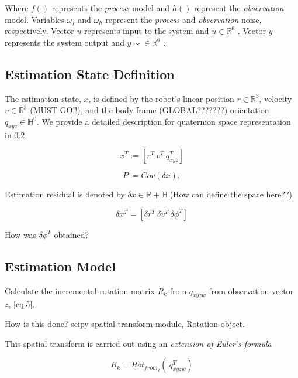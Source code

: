 \documentclass[letterpaper, 10 pt, conference]{ieeeconf}  %
\newcommand{\transpose}[1]{\ensuremath{#1^{\scriptscriptstyle T}}}
\begin{document}
Where $f()$ represents the \textit{process} model and $h()$ represent the
\textit{observation} model.
Variables $\omega_{f}$ and $\omega_{h}$ represent the \textit{process} and \textit{observation} noise, respectively.
Vector $u$ represents input to the system and $u \in \mathbb{R}^{6}$ .
Vector $y$ represents the system output and $y \sim \in \mathbb{R}^6$ .


\subsection{Estimation State Definition}

The estimation state, $x$, is defined by the robot's linear position $r \in \mathbb{R}^3$, velocity
$v \in \mathbb{R}^3$ (MUST GO!!), and the body frame (GLOBAL???????) orientation $q_{xyz} \in \mathbb{H}^0$. We provide a detailed description for quaternion space representation in \ref{}

\begin{equation}
\label{eq:8}
\transpose{x} :=  \left[\transpose{r}~\transpose{v}~\transpose{q_{xyz}} \right]
\end{equation}

\begin{equation}
\label{eq:9}
P := Cov(\delta x),
\end{equation}

Estimation residual is denoted by $\delta x \in \mathbb{R + H}$  (How can define the space here??)


\begin{equation}
\label{eq:10}
\delta \transpose{x} = \left[\transpose{\delta r} ~\transpose{\delta v} ~\transpose{\delta \phi} \right]
\end{equation}

How was $ \transpose{\delta \phi} $ obtained?


\subsection{Estimation Model}

Calculate the incremental rotation matrix $R_k$ from $q_{xyzw}$ from observation
vector $z$, \ref{eq:5}.

How is this done? scipy spatial transform module, Rotation object.

This spatial transform is carried out using an \textit{extension of Euler's formula}

\begin{equation}
\label{eq:11}
R_{k} = Rot_{from_q} \left( ~\transpose{q_{xyzw} } \right)
\end{equation}
\end{document}
